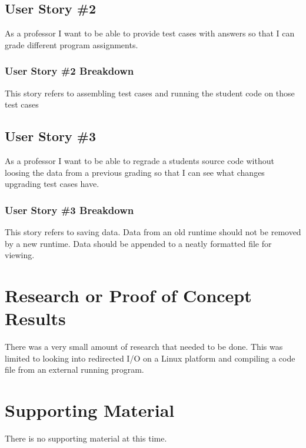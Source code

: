 \subsection{User Story \#2} 

As a professor I want to be able to provide test cases with answers so that I can grade different program assignments.

\subsubsection{User Story \#2 Breakdown}
This story refers to assembling test cases and running the student code on those test cases

\subsection{User Story \#3} 

As a professor I want to be able to regrade a students source code without loosing the data from a previous
grading so that I can see what changes upgrading test cases have.

\subsubsection{User Story \#3 Breakdown}
This story refers to saving data. Data from an old runtime should not be removed by a new runtime. Data should be appended to a neatly formatted file for viewing.


\section{Research or Proof of Concept Results}
There was a very small amount of research that needed to be done. This was limited to looking into redirected I/O on a Linux platform and compiling a code file from an external running program.


\section{Supporting Material}

There is no supporting material at this time.

